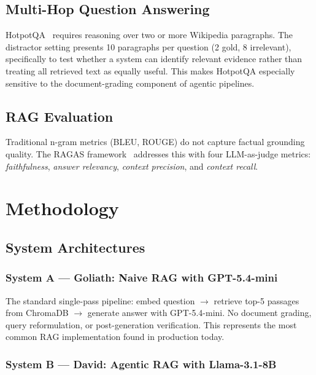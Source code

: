 \documentclass[12pt]{article}
\begin{document}
\subsection{Multi-Hop Question Answering}
HotpotQA~\cite{yang2018hotpotqa} requires reasoning over two or more Wikipedia
paragraphs.  The distractor setting presents 10 paragraphs per question
(2 gold, 8 irrelevant), specifically to test whether a system can identify
relevant evidence rather than treating all retrieved text as equally useful.
This makes HotpotQA especially sensitive to the document-grading component of
agentic pipelines.

\subsection{RAG Evaluation}
Traditional n-gram metrics (BLEU, ROUGE) do not capture factual grounding
quality.  The RAGAS framework~\cite{es2023ragas} addresses this with four
LLM-as-judge metrics: \emph{faithfulness}, \emph{answer relevancy},
\emph{context precision}, and \emph{context recall}.

\section{Methodology}

\subsection{System Architectures}

\subsubsection{System A --- Goliath: Naive RAG with GPT-5.4-mini}

The standard single-pass pipeline: embed question $\rightarrow$ retrieve top-5
passages from ChromaDB $\rightarrow$ generate answer with GPT-5.4-mini.  No
document grading, query reformulation, or post-generation verification.  This
represents the most common RAG implementation found in production today.

\subsubsection{System B --- David: Agentic RAG with Llama-3.1-8B}
\end{document}

